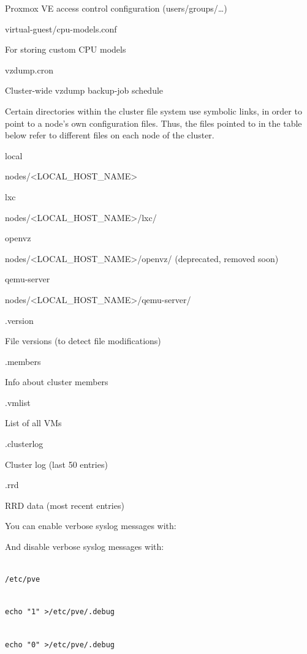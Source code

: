 Proxmox VE access control configuration (users/groups/…)

virtual-guest/cpu-models.conf

For storing custom CPU models

vzdump.cron

Cluster-wide vzdump backup-job schedule

Certain directories within the cluster file system use symbolic links, in order to point to a node’s own configuration files. Thus, the files pointed to in the table below refer to different files on each node of the cluster.

local

nodes/<LOCAL_HOST_NAME>

lxc

nodes/<LOCAL_HOST_NAME>/lxc/

openvz

nodes/<LOCAL_HOST_NAME>/openvz/ (deprecated, removed soon)

qemu-server

nodes/<LOCAL_HOST_NAME>/qemu-server/

.version

File versions (to detect file modifications)

.members

Info about cluster members

.vmlist

List of all VMs

.clusterlog

Cluster log (last 50 entries)

.rrd

RRD data (most recent entries)

You can enable verbose syslog messages with:

And disable verbose syslog messages with:

\begin{lstlisting}

/etc/pve

\end{lstlisting}

\begin{lstlisting}

echo "1" >/etc/pve/.debug

\end{lstlisting}

\begin{lstlisting}

echo "0" >/etc/pve/.debug

\end{lstlisting}

